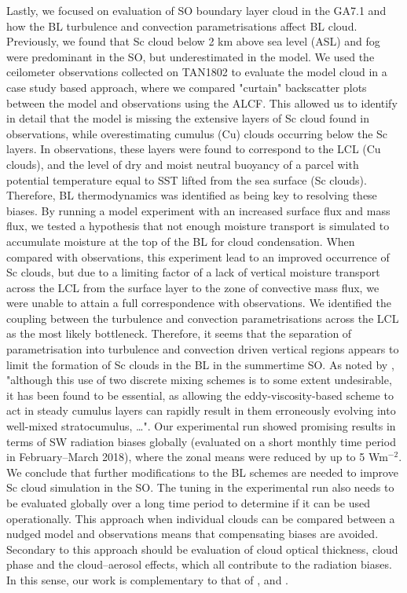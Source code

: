 Lastly, we focused on evaluation of SO boundary layer cloud in the GA7.1
and how the BL turbulence and convection parametrisations affect
BL cloud. Previously, we found that Sc cloud below 2 km above sea level (ASL)
and fog were predominant in the SO, but underestimated in the model. We used
the ceilometer observations collected on TAN1802 to evaluate the model cloud
in a case study based approach, where we compared "curtain" backscatter plots
between the model and observations using the ALCF. This allowed us to identify
in detail that the model is missing the extensive layers of Sc cloud found
in observations, while overestimating cumulus (Cu) clouds occurring below the
Sc layers. In observations, these layers were found to correspond to the LCL (Cu clouds),
and the level of dry and moist neutral buoyancy of a parcel with potential temperature
equal to SST lifted from the sea surface (Sc clouds). Therefore, BL
thermodynamics was identified as being key to resolving these biases. By running
a model experiment with an increased surface flux and mass flux, we tested
a hypothesis that not enough moisture transport is simulated to accumulate
moisture at the top of the BL for cloud condensation. When compared with
observations, this experiment lead to an improved occurrence of Sc clouds,
but due to a limiting factor of a lack of vertical moisture transport across
the LCL from the surface layer to the zone of convective mass flux,
we were unable to attain a full correspondence
with observations. We identified the coupling between the turbulence and convection
parametrisations across the LCL as the most likely bottleneck. Therefore, it seems
that the separation of parametrisation into turbulence and convection driven
vertical regions appears to limit the formation of Sc clouds in the BL in the
summertime SO. As noted by \cite{lock2000}, "although this use of two discrete 
mixing schemes is to some extent undesirable, it has been found to be essential,
as allowing the eddy-viscosity-based scheme to act in steady
cumulus layers can rapidly result in them erroneously
evolving into well-mixed stratocumulus, \ldots".
Our experimental run showed promising results in terms of
SW radiation biases globally (evaluated on a short monthly time period in February--March 2018),
where the zonal means were reduced by up to 5 Wm$^{-2}$. We conclude that
further modifications to the BL schemes are needed to improve
Sc cloud simulation in the SO. The tuning in the experimental run also needs to
be evaluated globally over a long time period to determine if it can be used
operationally. This approach when individual clouds can be compared between
a nudged model and observations means that compensating biases are avoided.
Secondary to this approach should be evaluation of cloud optical thickness,
cloud phase and the cloud--aerosol effects, which all contribute to the
radiation biases. In this sense, our work is complementary to that of
\cite{revell2019}, \cite{hartery2020a} and \cite{hartery2020b}.

